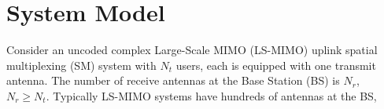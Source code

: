 \documentclass[12pt, draftclsnofoot, onecolumn]{IEEEtran}
\begin{document}
\section{System Model}
% 
% 
% 
% 

 
Consider an uncoded complex Large-Scale MIMO (LS-MIMO) uplink spatial multiplexing (SM) system with $N_{t}$ users, each is equipped with one transmit antenna. The number of receive antennas at the Base Station (BS) is $N_{r}$, $N_{r}\geq N_{t}$. Typically LS-MIMO systems have hundreds of antennas at the BS, 
    
\end{document}
